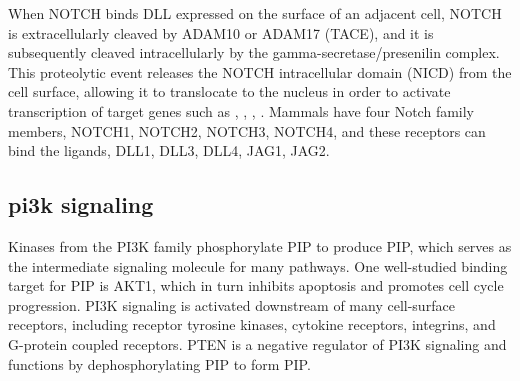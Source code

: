 		When NOTCH binds DLL expressed on the surface of an adjacent cell, NOTCH is extracellularly cleaved by ADAM10 or ADAM17 (TACE), and it is subsequently cleaved intracellularly by the gamma-secretase/presenilin complex. This proteolytic event releases the NOTCH intracellular domain (NICD) from the cell surface, allowing it to translocate to the nucleus in order to activate transcription of target genes such as , , , . Mammals have four Notch family members, NOTCH1, NOTCH2, NOTCH3, NOTCH4, and these receptors can bind the ligands, DLL1, DLL3, DLL4, JAG1, JAG2. 


\subsection{\gls{pi3k} signaling}

		Kinases from the PI3K family phosphorylate PIP to produce PIP, which serves as the intermediate signaling molecule for many pathways. One well-studied binding target for PIP is AKT1, which in turn inhibits apoptosis and promotes cell cycle progression. PI3K signaling is activated downstream of many cell-surface receptors, including receptor tyrosine kinases, cytokine receptors, integrins, and G-protein coupled receptors.
		PTEN is a negative regulator of PI3K signaling and functions by dephosphorylating PIP to form PIP. 


